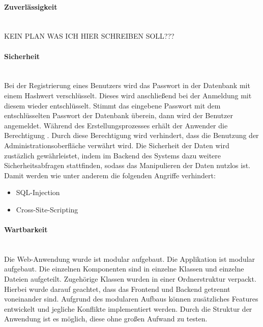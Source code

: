 \paragraph{Zuverlässigkeit}\mbox{} \\
\noindent
KEIN PLAN WAS ICH HIER SCHREIBEN SOLL???

\paragraph{Sicherheit}\mbox{} \\
\noindent
Bei der Registrierung eines Benutzers wird das Passwort in der Datenbank mit einem Hashwert verschlüsselt. Dieses wird anschließend bei der Anmeldung mit diesem wieder entschlüsselt. Stimmt das eingebene Passwort mit dem entschlüsselten Passwort der Datenbank überein, dann wird der Benutzer angemeldet. Während des Erstellungsprozesses erhält der Anwender die Berechtigung . Durch diese Berechtigung wird verhindert, dass die Benutzung der Administrationsoberfläche verwährt wird.
\newline
\newline
Die Sicherheit der Daten wird zustäzlich gewährleistet, indem im Backend des Systems dazu weitere Sicherheitsabfragen stattfinden, sodass das Manipulieren der Daten nutzlos ist. Damit werden wie unter anderem die folgenden Angriffe verhindert:
\begin{itemize}
  \item SQL-Injection
  \item Cross-Site-Scripting
\end{itemize}

\paragraph{Wartbarkeit}\mbox{} \\
\noindent
Die Web-Anwendung wurde ist modular aufgebaut.  Die Applikation ist modular aufgebaut. Die einzelnen Komponenten sind in einzelne Klassen und einzelne Dateien aufgeteilt. Zugehörige Klassen wurden in einer Ordnerstruktur verpackt. Hierbei wurde darauf geachtet, dass das Frontend und Backend getrennt voneinander sind. Aufgrund des modularen Aufbaus können zusätzliches Features entwickelt und jegliche Konflikte implementiert werden. %
Durch die Struktur der Anwendung ist es möglich, diese ohne großen Aufwand zu testen.

